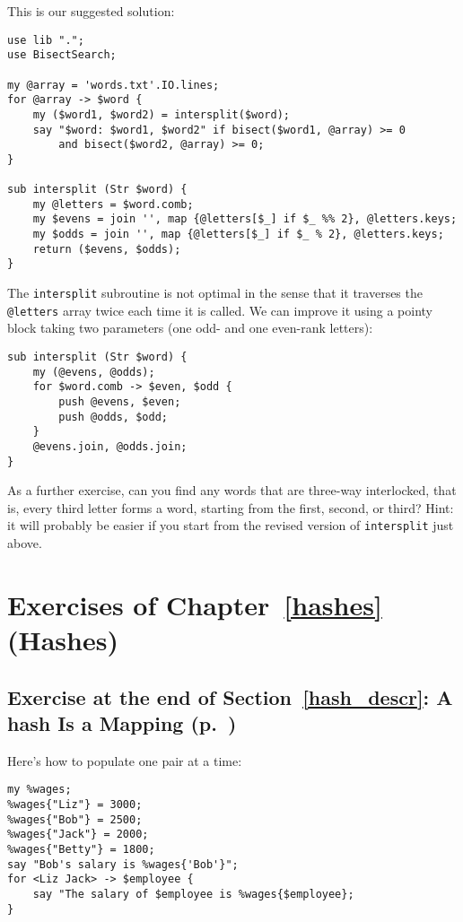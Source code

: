 This is our suggested solution:
\begin{verbatim}
use lib ".";
use BisectSearch;

my @array = 'words.txt'.IO.lines;
for @array -> $word {
    my ($word1, $word2) = intersplit($word);
    say "$word: $word1, $word2" if bisect($word1, @array) >= 0 
        and bisect($word2, @array) >= 0;
}

sub intersplit (Str $word) {
    my @letters = $word.comb;
    my $evens = join '', map {@letters[$_] if $_ %% 2}, @letters.keys;
    my $odds = join '', map {@letters[$_] if $_ % 2}, @letters.keys;
    return ($evens, $odds);
}
\end{verbatim}

The {\tt intersplit} subroutine is not optimal in the 
sense that it traverses the \verb'@letters' array twice 
each time it is called. We can improve it using a pointy 
block taking two parameters (one odd- and one even-rank 
letters):
\begin{verbatim}
sub intersplit (Str $word) {
    my (@evens, @odds);
    for $word.comb -> $even, $odd {
        push @evens, $even;
        push @odds, $odd;
    }
    @evens.join, @odds.join;
}
\end{verbatim}

As a further exercise, can you find any words that are 
three-way interlocked, that is, every third letter forms a 
word, starting from the first, second, or third? Hint: it 
will probably be easier if you start from the revised 
version of {\tt intersplit} just above.

\section{Exercises of Chapter~\ref{hashes} (Hashes)}

\subsection{Exercise at the end of Section~\ref{hash_descr}: A hash Is a Mapping (p.~\pageref{ex_employees})}
\label{sol_ex_employees}

Here's how to populate one pair at a time:

\begin{verbatim}
my %wages;
%wages{"Liz"} = 3000;
%wages{"Bob"} = 2500;
%wages{"Jack"} = 2000;
%wages{"Betty"} = 1800;
say "Bob's salary is %wages{'Bob'}";
for <Liz Jack> -> $employee {
    say "The salary of $employee is %wages{$employee};
}
\end{verbatim}

